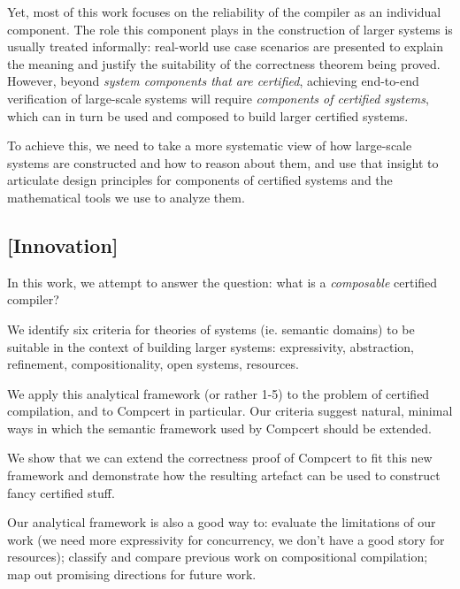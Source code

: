 \documentclass[sigplan,10pt,review,anonymous]{acmart}
\begin{document}
Yet, most of this work
focuses on the reliability of the compiler
as an individual component.
The role this component plays in the construction of larger systems
is usually treated informally:
real-world use case scenarios are presented
to explain the meaning and justify the suitability
of the correctness theorem being proved.
However,
beyond \emph{system components that are certified},
achieving end-to-end verification of large-scale systems
will require \emph{components of certified systems},
which can in turn be used and composed
to build larger certified systems.

To achieve this, we need to take
a more systematic view of
how large-scale systems are constructed and
how to reason about them,
and use that insight to
articulate design principles for
components of certified systems
and the mathematical tools we use to analyze them.

\subsection{[Innovation]}

In this work, we attempt to answer the question:
what is a \emph{composable} certified compiler?

We identify six criteria for theories of systems (ie. semantic domains)
to be suitable in the context of building larger systems:
expressivity, abstraction, refinement,
compositionality, open systems, resources.

We apply this analytical framework (or rather 1-5)
to the problem of certified compilation,
and to Compcert in particular.
Our criteria suggest natural,
minimal ways in which the semantic framework
used by Compcert should be extended.

We show that we can extend the correctness proof of Compcert
to fit this new framework and
demonstrate how the resulting artefact
can be used to construct fancy certified stuff.

Our analytical framework is also a good way to:
evaluate the limitations of our work
(we need more expressivity for concurrency,
we don't have a good story for resources);
classify and compare previous work on compositional compilation;
map out promising directions for future work.
\end{document}
